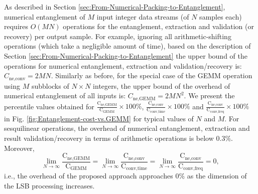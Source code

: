 \documentclass[twocolumn,english,onecolumn]{IEEEtran}
\theoremstyle{plain}
\theoremstyle{plain}
\begin{document}
As described in Section \ref{sec:From-Numerical-Packing-to-Entanglement},
numerical entanglement of $M$ input integer data streams (of $N$
samples each) requires $O\left(MN\right)$ operations for the entanglement,
extraction and validation (or recovery) per output sample. For example,
ignoring all arithmetic-shifting operations (which take a negligible
amount of time), based on the description of Section \ref{sec:From-Numerical-Packing-to-Entanglement}
the upper bound of the operations for numerical entanglement, extraction
and validation/recovery is: $C_{\text{ne,conv}}=2MN$. Similarly as
before, for the special case of the GEMM operation using $M$ subblocks
of $N\times N$ integers, the upper bound of the overhead of numerical
entanglement of all inputs is: $C_{\text{ne,GEMM}}=2MN^{2}$. We present
the percentile values obtained for $\frac{\mathrm{C}_{\text{ne,GEMM}}}{\mathrm{C}_{\text{GEMM}}}\times100\%$,
$\frac{\mathrm{C}_{\text{ne,conv}}}{\mathrm{C}_{\text{conv,time}}}\times100\%$
and $\frac{\mathrm{C}_{\text{ne,conv}}}{\mathrm{C}_{\text{conv,freq}}}\times100\%$
in Fig. \ref{fig:Entanglement-cost-vs.GEMM} for typical values of
$N$ and $M$. For sesquilinear operations, the overhead of numerical
entanglement, extraction and result validation/recovery in terms of
arithmetic operations is below $0.3\%$. Moreover, 
\begin{equation}
\lim_{N\rightarrow\infty}\frac{\mathrm{C}_{\text{ne,GEMM}}}{\mathrm{C}_{\text{GEMM}}}=\lim_{N\rightarrow\infty}\frac{\mathrm{C}_{\text{ne,conv}}}{\mathrm{C}_{\text{conv,time}}}=\lim_{N\rightarrow\infty}\frac{\mathrm{C}_{\text{ne,conv}}}{\mathrm{C}_{\text{conv,freq}}}=0,
\end{equation}
i.e., the overhead of the proposed approach approaches $0\%$ as the
dimension of the LSB processing increases. 
\end{document}
